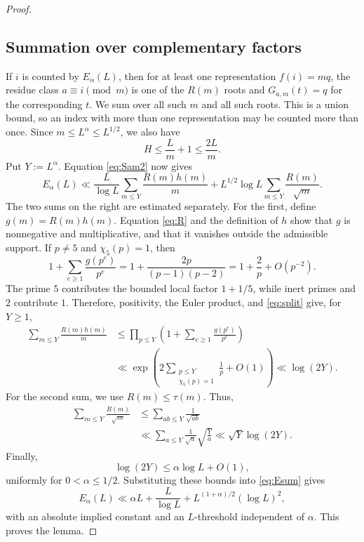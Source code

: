 \documentclass[11pt]{amsart}
\theoremstyle{definition}
\theoremstyle{remark}
\begin{document}
\begin{proof}
\subsection{Summation over complementary factors}

If $i$ is counted by $E_\alpha(L)$,
then for at least one representation $f(i)=mq$, the residue class
$a\equiv i\pmod m$ is one of the $R(m)$ roots and $G_{a,m}(t)=q$ for the
corresponding $t$.  We sum over all such $m$ and all such roots.  This is a
union bound, so an index with more than one representation may be counted
more than once.  Since $m\leq L^\alpha\leq L^{1/2}$, we also have
\[
H\leq\frac Lm+1\leq\frac{2L}{m}.
\]
Put $Y:=L^\alpha$.  Equation \eqref{eq:Sam2} now gives
\begin{equation}\label{eq:Esum}
E_\alpha(L)
\ll
\frac{L}{\log L}
\sum_{m\leq Y}\frac{R(m)h(m)}m
+L^{1/2}\log L
\sum_{m\leq Y}\frac{R(m)}{\sqrt m}.
\end{equation}
The two sums on the right are estimated separately.  For the first, define
$g(m)=R(m)h(m)$.  Equation \eqref{eq:R} and the definition of $h$ show that
$g$ is nonnegative and multiplicative, and that it vanishes outside the
admissible support.  If $p\neq5$ and $\chi_5(p)=1$, then
  \[
  1+\sum_{e\geq1}\frac{g(p^e)}{p^e}
  =1+\frac{2p}{(p-1)(p-2)}
  =1+\frac2p+O(p^{-2}).
  \]
The prime $5$ contributes the bounded local factor $1+1/5$, while inert
primes and $2$ contribute $1$.  Therefore, positivity, the Euler product,
and \eqref{eq:split} give, for $Y\geq1$,
  \begin{align*}
  \sum_{m\leq Y}\frac{R(m)h(m)}m
  &\leq
  \prod_{p\leq Y}\left(1+\sum_{e\geq1}\frac{g(p^e)}{p^e}\right)\\
  &\ll
  \exp\left(
  2\sum_{\substack{p\leq Y\\ \chi_5(p)=1}}\frac1p+O(1)
  \right)
  \ll\log(2Y).
  \end{align*}
For the second sum, we use $R(m)\leq\tau(m)$.  Thus,
\begin{align*}
\sum_{m\leq Y}\frac{R(m)}{\sqrt m}
&\leq
\sum_{ab\leq Y}\frac1{\sqrt{ab}}\\
&\ll
\sum_{a\leq Y}\frac1{\sqrt a}\sqrt{\frac Ya}
\ll\sqrt Y\log(2Y).
\end{align*}
Finally,
  \[
  \log(2Y)\leq\alpha\log L+O(1),
  \]
uniformly for $0<\alpha\leq1/2$.  Substituting these bounds into
\eqref{eq:Esum} gives
  \[
  E_\alpha(L)
  \ll \alpha L+\frac{L}{\log L}
  +L^{(1+\alpha)/2}(\log L)^2,
  \]
with an absolute implied constant and an $L$-threshold independent of
$\alpha$.  This proves the lemma.
\end{proof}
\end{document}
